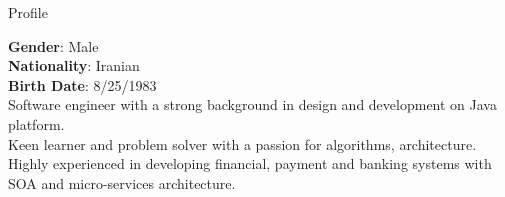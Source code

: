 
\begin{jrsection}[location = sidebar]{Profile}
    \begin{jrdescription}
        {\bfseries Gender}: Male \\
        {\bfseries Nationality}: Iranian \\
        {\bfseries Birth Date}: 8/25/1983 \\
        Software engineer with a strong background in design and development on Java platform.\\
        Keen learner and problem solver with a passion for algorithms, architecture.\\
        Highly experienced in developing financial, payment and banking systems with SOA and micro-services architecture.
    \end{jrdescription}
\end{jrsection}
